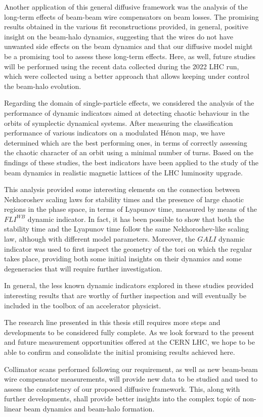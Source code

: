 Another application of this general diffusive framework was the analysis of the long-term effects of beam-beam wire compensators on beam losses. The promising results obtained in the various fit reconstructions provided, in general, positive insight on the beam-halo dynamics, suggesting that the wires do not have unwanted side effects on the beam dynamics and that our diffusive model might be a promising tool to assess these long-term effects. Here, as well, future studies will be performed using the recent data collected during the 2022 LHC run, which were collected using a better approach that allows keeping under control the beam-halo evolution.

Regarding the domain of single-particle effects, we considered the analysis of the performance of dynamic indicators aimed at detecting chaotic behaviour in the orbits of symplectic dynamical systems. After measuring the classification performance of various indicators on a modulated Hénon map, we have determined which are the best performing ones, in terms of correctly assessing the chaotic character of an orbit using a minimal number of turns. Based on the findings of these studies, the best indicators have been applied to the study of the beam dynamics in realistic magnetic lattices of the LHC luminosity upgrade.

This analysis provided some interesting elements on the connection between Nekhoroshev scaling laws for stability times and the presence of large chaotic regions in the phase space, in terms of Lyapunov time, measured by means of the $FLI^{WB}$ dynamic indicator. In fact, it has been possible to show that both the stability time and the Lyapunov time follow the same Nekhoroshev-like scaling law, although with different model parameters. Moreover, the $GALI$ dynamic indicator was used to first inspect the geometry of the tori on which the regular takes place, providing both some initial insights on their dynamics and some degeneracies that will require further investigation.

In general, the less known dynamic indicators explored in these studies provided interesting results that are worthy of further inspection and will eventually be included in the toolbox of an accelerator physicist.

The research line presented in this thesis still requires more steps and developments to be considered fully complete. As we look forward to the present and future measurement opportunities offered at the CERN LHC, we hope to be able to confirm and consolidate the initial promising results achieved here.

Collimator scans performed following our requirement, as well as new beam-beam wire compensator measurements, will provide new data to be studied and used to assess the consistency of our proposed diffusive framework. This, along with further developments, shall provide better insights into the complex topic of non-linear beam dynamics and beam-halo formation.


